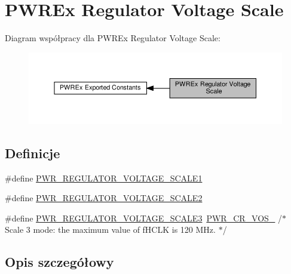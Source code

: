 \hypertarget{group___p_w_r_ex___regulator___voltage___scale}{}\section{P\+W\+R\+Ex Regulator Voltage Scale}
\label{group___p_w_r_ex___regulator___voltage___scale}
Diagram współpracy dla P\+W\+R\+Ex Regulator Voltage Scale\+:\nopagebreak
\begin{figure}[H]
\begin{center}
\leavevmode
\includegraphics[width=350pt]{group___p_w_r_ex___regulator___voltage___scale}
\end{center}
\end{figure}
\subsection*{Definicje}
\begin{DoxyCompactItemize}
\item 
\#define \hyperlink{group___p_w_r_ex___regulator___voltage___scale_ga3b5ca5ab9c19938a14d273825bcf840e}{P\+W\+R\+\_\+\+R\+E\+G\+U\+L\+A\+T\+O\+R\+\_\+\+V\+O\+L\+T\+A\+G\+E\+\_\+\+S\+C\+A\+L\+E1}
\item 
\#define \hyperlink{group___p_w_r_ex___regulator___voltage___scale_gaa0d38e304a0adfdbb58a61c96bdb95e9}{P\+W\+R\+\_\+\+R\+E\+G\+U\+L\+A\+T\+O\+R\+\_\+\+V\+O\+L\+T\+A\+G\+E\+\_\+\+S\+C\+A\+L\+E2}
\item 
\#define \hyperlink{group___p_w_r_ex___regulator___voltage___scale_gabed272232ad95f663da2a758834d0ba9}{P\+W\+R\+\_\+\+R\+E\+G\+U\+L\+A\+T\+O\+R\+\_\+\+V\+O\+L\+T\+A\+G\+E\+\_\+\+S\+C\+A\+L\+E3}~\hyperlink{group___peripheral___registers___bits___definition_ga27b4e08a8936aa9828c5d683fde2fb59}{P\+W\+R\+\_\+\+C\+R\+\_\+\+V\+O\+S\+\_}           /$\ast$ Scale 3 mode\+: the maximum value of f\+H\+C\+LK is 120 M\+Hz. $\ast$/
\end{DoxyCompactItemize}


\subsection{Opis szczegółowy}


